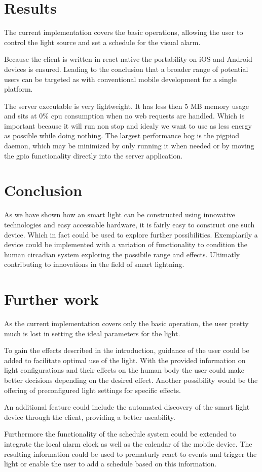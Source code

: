 \documentclass[conference]{IEEEtran}
\begin{document}
\section{Results}
The current implementation covers the basic operations, allowing the user to control the light source and set a schedule
for the visual alarm. 

Because the client is written in react-native the portability on iOS and Android devices is ensured. Leading to the conclusion
that a broader range of potential users can be targeted as with conventional mobile development for a single platform.

The server executable is very lightweight. It has less then 5 MB memory usage and sits at 0\% cpu consumption when no web
requests are handled. Which is important because it will run non stop and idealy we want to use as less energy as possible while
doing nothing. The largest performance hog is the pigpiod daemon, which may be minimized by only running it when needed or by moving
the gpio functionality directly into the server application. 


\section{Conclusion}
As we have shown how an smart light can be constructed using innovative technologies and easy accessable hardware, it is fairly
easy to construct one such device. Which in fact could be used to explore further possibilities. Exemplarily a device could be
implemented with a variation of functionality to condition the human circadian system exploring the possibile range and effects.
Ultimatly contributing to innovations in the field of smart lightning.


\section{Further work}
As the current implementation covers only the basic operation, the user pretty much is lost in setting the ideal parameters
for the light.

To gain the effects described in the introduction, guidance of the user could be added to facilitate
optimal use of the light. With the provided information on light configurations and their effects on the human body
the user could make better decisions depending on the desired effect. Another possibility would be the offering of preconfigured
light settings for specific effects.

An additional feature could include the automated discovery of the smart light device through the client, providing a 
better useability. 

Furthermore the functionality of the schedule system could be extended to integrate the local alarm clock as well as the calendar
of the mobile device. The resulting information could be used to prematurly react to events and trigger the light or enable the user
to add a schedule based on this information. 




\end{document}
